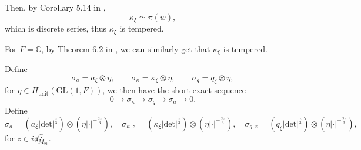 \documentclass[11pt]{amsart}
\renewcommand{\rm}{\mathrm}
\newcommand{\GGL}{\mathrm{GL}}
\theoremstyle{definition}
\numberwithin{equation}{section}
\begin{document}
	Then, by Corollary 5.14 in \cite{JL70}, \[\kappa_\xi\simeq \pi(w),\]which is discrete series, thus \(\kappa_\xi\) is tempered.
	
	For \(F=\mathbb{C}\), by Theorem 6.2 in \cite{JL70}, we can similarly get that \(\kappa_\xi\) is tempered.
	
	
	Define
	\[\sigma_a = a_\xi \otimes \eta, \qquad \sigma_\kappa = \kappa_\xi \otimes \eta, \qquad \sigma_q = q_\xi \otimes \eta,\]for \(\eta\in\Pi_{\rm{unit}}({\GGL(1,F)})\), we then have the short exact sequence
	\[0 \longrightarrow \sigma_\kappa \longrightarrow \sigma_q \longrightarrow \sigma_a \longrightarrow 0.\]
	Define 
	\[\sigma_a=(a_\xi |\rm{det}|^{\frac{z}{3}})\otimes (\eta |\cdot|^{-\frac{2z}{3}}),\quad \sigma_{\kappa,z}= (\kappa_\xi  |\rm{det}|^{\frac{z}{3}}) \otimes (\eta|\cdot|^{-\frac{2z}{3}}), \quad \sigma_{q,z} =(q_\xi  |\rm{det}|^{\frac{z}{3}})  \otimes (\eta|\cdot|^{-\frac{2z}{3}}),\]for \(z\in i\mathfrak{a}_{M_{21}}^G\).
	
\end{document}
